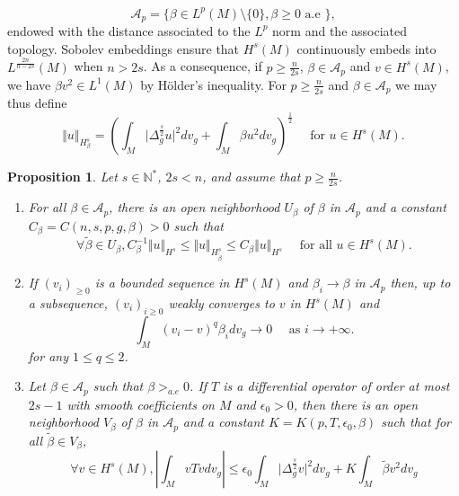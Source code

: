 \documentclass[10pt]{amsart}
\numberwithin{equation}{section}
\newcommand{\N}{\mathbb{N}}
\def\ep{{\varepsilon}}
\def \ep{\epsilon}
\theoremstyle{plain}
\newtheorem{prop}[theo]{Proposition}%
\theoremstyle{remark}
\begin{document}
\begin{equation} \label{def:Ap}
 \mathcal{A}_p = \{ \beta \in L^p(M) \setminus \{0\}  ,\beta \geq 0 \text{ a.e } \} ,
 \end{equation}
endowed with the distance associated to the $L^p$ norm and the associated topology. Sobolev embeddings ensure that $H^s(M)$ continuously embeds into $L^{\frac{2n}{n-2s}}(M)$ when $n >2s$. As a consequence, if  $p \ge \frac{n}{2s}$, $\beta \in \mathcal{A}_p$ and $v \in H^s(M)$, we have $\beta v^2 \in L^1(M)$ by H\"older's inequality. For $p \ge \frac{n}{2s}$ and $\beta \in \mathcal{A}_p$ we may thus define 
$$\Vert u \Vert_{H^s_\beta}= \left(\int_M \big|\Delta_g^{\frac{s}{2}} u \big|^2 dv_g +\int_M \beta u^2 dv_g \right)^{\frac{1}{2}} \quad \text{ for } u \in H^s(M). $$



\begin{prop} \label{prop:eqnormscompactness}
Let $s \in \N^*$, $2s < n$, and assume that $p \geq \frac{n}{2s}$.
\begin{enumerate}
\item For all $\beta \in \mathcal{A}_p$, there is an open neighborhood $U_\beta$ of $\beta$ in $\mathcal{A}_p$ and a constant $C_\beta = C(n,s,p,g,\beta) >0$ such that 
$$ \forall \tilde{\beta}\in U_\beta, C_\beta^{-1} \Vert u \Vert_{H^s} \leq  \Vert u \Vert_{H^s_{\tilde{\beta}}} \leq C_\beta \Vert u \Vert_{H^s} \quad \text{ for all } u \in H^s(M). $$
\item If $(v_i)_{\geq 0}$ is a bounded sequence in $H^s(M)$ and $\beta_i \to \beta$ in $\mathcal{A}_p$ then, up to a subsequence, $(v_i)_{i\geq 0}$ weakly converges to $v$ in $H^s(M)$ and
\begin{equation} \label{eq:cvforte}
\int_{M} (v_i - v)^q \beta_i dv_g \to 0 \quad \text{ as } i \to + \infty. 
\end{equation}
for any $1 \leq q \le 2$.
\item Let $\beta \in \mathcal{A}_p$ such that $\beta>_{a.e}0 $. If $T$ is a differential operator of order at most $2s-1$ with smooth coefficients on $M$ and $\ep_0 >0$, then there is an open neighborhood $V_\beta$ of $\beta$ in $\mathcal{A}_p$ and a constant $K = K(p,T,\ep_0,\beta)$ such that for all $\tilde{\beta}\in V_\beta$,
$$ \forall v \in H^s(M), \left\vert \int_{M} vTv dv_g \right\vert \leq \ep_0 \int_M \big|\Delta_g^{\frac{s}{2}} v \big|^2 dv_g + K \int_M \tilde{\beta} v^2 dv_g $$
\end{enumerate}
\end{prop}
\end{document}
